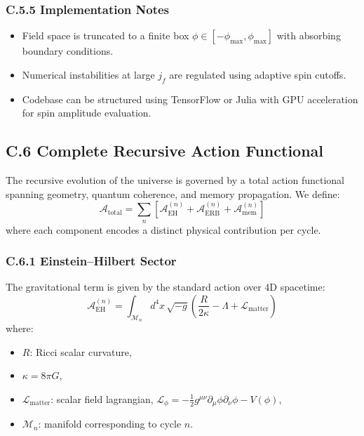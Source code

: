 \subsubsection*{C.5.5 Implementation Notes}

\begin{itemize}
  \item Field space is truncated to a finite box \( \phi \in [-\phi_{\max}, \phi_{\max}] \) with absorbing boundary conditions.
  \item Numerical instabilities at large \( j_f \) are regulated using adaptive spin cutoffs.
  \item Codebase can be structured using TensorFlow or Julia with GPU acceleration for spin amplitude evaluation.
\end{itemize}

\subsection*{C.6 Complete Recursive Action Functional}
\label{appendix:C6}

The recursive evolution of the universe is governed by a total action functional spanning geometry, quantum coherence, and memory propagation. We define:
\begin{equation}
\mathcal{A}_{\text{total}} = \sum_{n} \left[ \mathcal{A}_{\text{EH}}^{(n)} + \mathcal{A}_{\text{ERB}}^{(n)} + \mathcal{A}_{\text{mem}}^{(n)} \right]
\end{equation}
where each component encodes a distinct physical contribution per cycle.

\subsubsection*{C.6.1 Einstein–Hilbert Sector}

The gravitational term is given by the standard action over 4D spacetime:
\begin{equation}
\mathcal{A}_{\text{EH}}^{(n)} = \int_{\mathcal{M}_n} d^4x \, \sqrt{-g} \left( \frac{R}{2\kappa} - \Lambda + \mathcal{L}_{\text{matter}} \right)
\end{equation}
where:
\begin{itemize}
  \item \( R \): Ricci scalar curvature,
  \item \( \kappa = 8\pi G \),
  \item \( \mathcal{L}_{\text{matter}} \): scalar field lagrangian, \( \mathcal{L}_{\phi} = -\frac{1}{2} g^{\mu\nu} \partial_\mu \phi \partial_\nu \phi - V(\phi) \),
  \item \( \mathcal{M}_n \): manifold corresponding to cycle \( n \).
\end{itemize}

